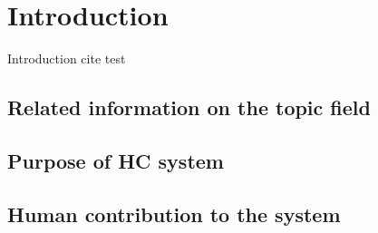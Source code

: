\section{Introduction}

Introduction cite test \cite{Bry2013}

\subsection{Related information on the topic field}
\subsection{Purpose of HC system}
\subsection{Human contribution to the system}
